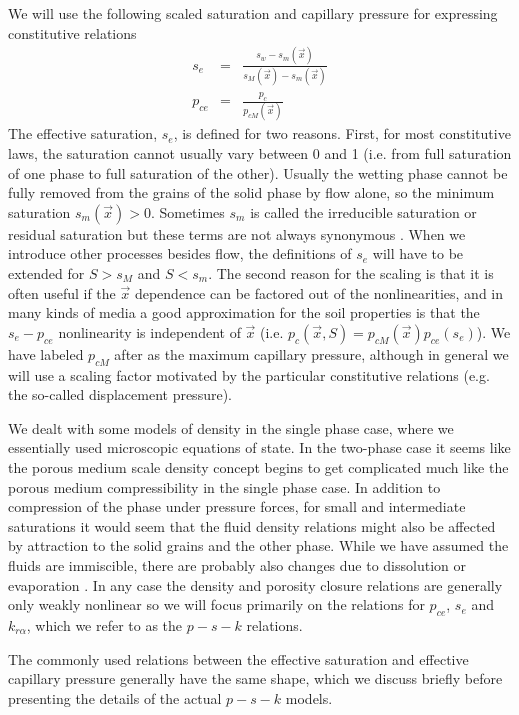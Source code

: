 \documentclass[10pt,dvips,twoside,reqno]{amsart}
\begin{document}
We will use the following scaled saturation and capillary pressure for
expressing constitutive relations
\begin{eqnarray}
s_e &=& \frac{s_w - s_m(\vec x)}{s_M (\vec x) - s_m(\vec x)} \\
p_{ce} &=& \frac{p_c}{p_{cM} (\vec x)} 
\end{eqnarray}
The effective saturation, $s_e$, is defined for two reasons.
First, for most constitutive laws, the saturation cannot usually vary
between 0 and 1 (i.e. from full saturation of one phase to full
saturation of the other). Usually the wetting phase cannot be fully
removed from the grains of the solid phase by flow alone, so the
minimum saturation $s_m(\vec x) > 0$.  Sometimes $s_m$ is called the
irreducible saturation or residual saturation but these terms are not
always synonymous \citep{Parker_Lenhard_etal_87}.  When we introduce
other processes besides flow, the definitions of $s_e$ will have
to be extended for $S > s_M$ and $S < s_m$. The second reason for the
scaling is that it is often useful if the $\vec x$ dependence can be
factored out of the nonlinearities, and in many kinds of media a good
approximation for the soil properties is that the $s_e-p_{ce}$
nonlinearity is independent of $\vec x$ (i.e.  $p_c(\vec x, S) =
p_{cM}(\vec x) p_{ce}(s_e)$). We have labeled $p_{cM}$ after
\citep{Chavent_Jaffre_86} as the maximum capillary pressure, although
in general we will use a scaling factor motivated by the particular
constitutive relations (e.g. the so-called displacement pressure).


We dealt with some models of density in the single phase case, where
we essentially used microscopic equations of state. In the two-phase
case it seems like the porous medium scale density concept begins to
get complicated much like the porous medium compressibility in the
single phase case. In addition to compression of the phase under
pressure forces, for small and intermediate saturations it would seem
that the fluid density relations might also be affected by attraction
to the solid grains and the other phase. While we have assumed the
fluids are immiscible, there are probably also changes due to
dissolution or evaporation \citep{Helmig_97}. In any case the density
and porosity closure relations are generally only weakly nonlinear so
we will focus primarily on the relations for $p_{ce}$, $s_e$
and $k_{r\alpha}$, which we refer to as the $p-s-k$ relations.

The commonly used relations between the effective saturation and
effective capillary pressure generally have the same shape, which we
discuss briefly before presenting the details of the actual
$p-s-k$ models.
\end{document}
